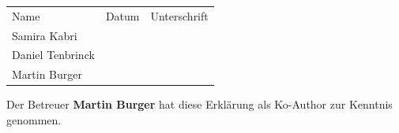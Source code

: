 \documentclass[12pt]{article}
\begin{document}
\renewcommand{\arraystretch}{4}
\begin{tabular}{l l l}
Name & Datum & Unterschrift\\
Samira Kabri & \raisebox{-3pt}{\makebox[5cm]{.\dotfill}} & \raisebox{-3pt}{\makebox[5cm]{.\dotfill}}\\
%
Daniel Tenbrinck & \raisebox{-3pt}{\makebox[5cm]{.\dotfill}} & \raisebox{-3pt}{\makebox[5cm]{.\dotfill}}\\
Martin Burger & \raisebox{-3pt}{\makebox[5cm]{.\dotfill}} & \raisebox{-3pt}{\makebox[5cm]{.\dotfill}}\\
\end{tabular}%
%
\vspace{50pt}

Der Betreuer \textbf{Martin Burger} hat diese Erklärung als Ko-Author zur Kenntnis genommen.

 
\end{document}

